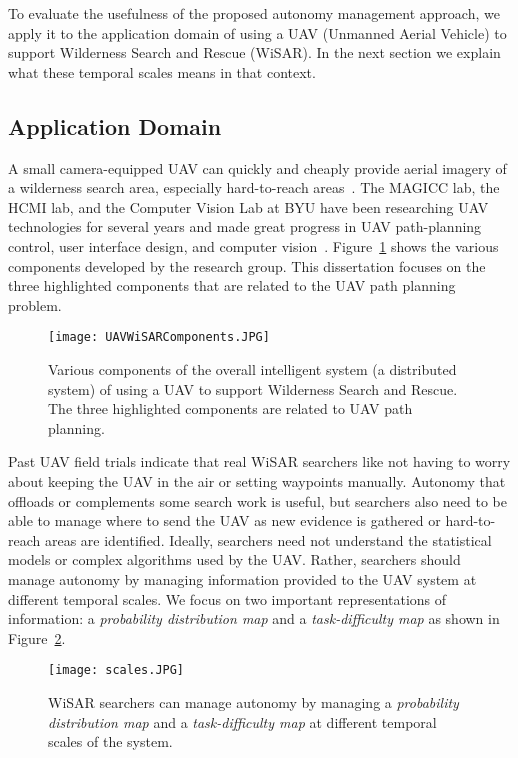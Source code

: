 To evaluate the usefulness of the proposed autonomy management approach, we apply it to the application domain of using a UAV (Unmanned Aerial Vehicle) to support Wilderness Search and Rescue (WiSAR). In the next section we explain what these temporal scales means in that context. 

\subsection{Application Domain}

A small camera-equipped UAV can quickly and cheaply provide aerial imagery of a wilderness search area, especially hard-to-reach areas~\cite{Goodrich2008Supporting}. The MAGICC lab, the HCMI lab, and the Computer Vision Lab at BYU have been researching UAV technologies for several years and made great progress in UAV path-planning control, user interface design, and computer vision~\cite{Lin2010Supporting}. Figure~\ref{SystemComponents} shows the various components developed by the research group. This dissertation focuses on the three highlighted components that are related to the UAV path planning problem.

\begin{figure}
\centering
\texttt{[image: UAVWiSARComponents.JPG]}
\caption{Various components of the overall intelligent system (a distributed system) of using a UAV to support Wilderness Search and Rescue. The three highlighted components are related to UAV path planning.}
\label{SystemComponents}
\end{figure}

Past UAV field trials indicate that real WiSAR searchers like not having to worry about keeping the UAV in the air or setting waypoints manually. Autonomy that offloads or complements some search work is useful, but searchers also need to be able to manage where to send the UAV as new evidence is gathered or hard-to-reach areas are identified. Ideally, searchers need not understand the statistical models or complex algorithms used by the UAV. Rather, searchers should manage autonomy by managing information provided to the UAV system at different temporal scales. We focus on two important representations of information: a \textit{probability distribution map} and a \textit{task-difficulty map} as shown in Figure~\ref{Scales}.

\begin{figure}
\centering
\texttt{[image: scales.JPG]}
\caption{WiSAR searchers can manage autonomy by managing a \textit{probability distribution map} and a \textit{task-difficulty map} at different temporal scales of the system.}
\label{Scales}
\end{figure}

